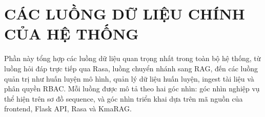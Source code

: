 \chapter{CÁC LUỒNG DỮ LIỆU CHÍNH CỦA HỆ THỐNG}

Phần này tổng hợp các luồng dữ liệu quan trọng nhất trong toàn bộ hệ thống, từ luồng hỏi đáp trực tiếp qua Rasa, luồng chuyển nhánh sang RAG, đến các luồng quản trị như huấn luyện mô hình, quản lý dữ liệu huấn luyện, ingest tài liệu và phân quyền RBAC. Mỗi luồng được mô tả theo hai góc nhìn: góc nhìn nghiệp vụ thể hiện trên sơ đồ sequence, và góc nhìn triển khai dựa trên mã nguồn của frontend, Flask API, Rasa và KmaRAG.












